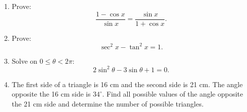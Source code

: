 \documentclass[12pt]{article}
\begin{document}
\begin{enumerate}[leftmargin=*, itemsep=0.9em]
  \item Prove:
  \[
  \frac{1-\cos x}{\sin x}=\frac{\sin x}{1+\cos x}.
  \]

  \item Prove:
  \[
  \sec^2 x-\tan^2 x=1.
  \]

  \item Solve on $0\le \theta<2\pi$:
  \[
  2\sin^2\theta-3\sin\theta+1=0.
  \]

  \item The first side of a triangle is 16 cm and the second side is 21 cm. The angle opposite the 16 cm side is $34^\circ$. Find all possible values of the angle opposite the 21 cm side and determine the number of possible triangles.
\end{enumerate}
\end{document}
